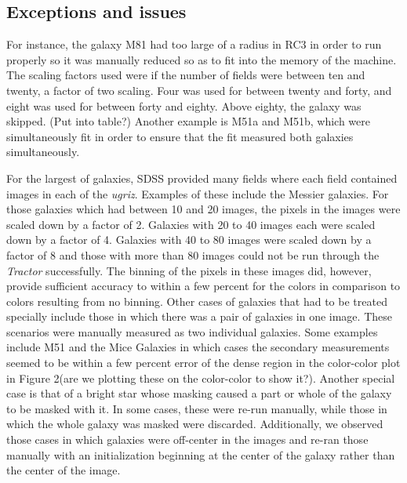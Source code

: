 \documentclass[12pt,preprint,pdftex]{aastex}
\begin{document}




\subsection{Exceptions and issues}\label{sec:results}
For instance, the galaxy M81 had too large of a radius in RC3 in order
to run properly so it was manually reduced so as to fit into the
memory of the machine. The scaling factors used were if the number of
fields were between ten and twenty, a factor of two scaling. Four was
used for between twenty and forty, and eight was used for between
forty and eighty. Above eighty, the galaxy was skipped. (Put into
table?) Another example is M51a and M51b, which were simultaneously
fit in order to ensure that the fit measured both galaxies
simultaneously.

For the largest of galaxies, SDSS provided many fields where each
field contained images in each of the \textit{ugriz}. Examples of
these include the Messier galaxies. For those galaxies which had
between 10 and 20 images, the pixels in the images were scaled down by
a factor of 2. Galaxies with 20 to 40 images each were scaled down by
a factor of 4. Galaxies with 40 to 80 images were scaled down by a
factor of 8 and those with more than 80 images could not be run
through the \textit{Tractor} successfully. The binning of the pixels
in these images did, however, provide sufficient accuracy to within a
few percent for the colors in comparison to colors resulting from no
binning. Other cases of galaxies that had to be treated specially
include those in which there was a pair of galaxies in one
image. These scenarios were manually measured as two individual
galaxies. Some examples include M51 and the Mice Galaxies in which
cases the secondary measurements seemed to be within a few percent
error of the dense region in the color-color plot in Figure 2(are we
plotting these on the color-color to show it?). Another special case
is that of a bright star whose masking caused a part or whole of the
galaxy to be masked with it. In some cases, these were re-run
manually, while those in which the whole galaxy was masked were
discarded.  Additionally, we observed those cases in which galaxies
were off-center in the images and re-ran those manually with an
initialization beginning at the center of the galaxy rather than the
center of the image.
\end{document}
